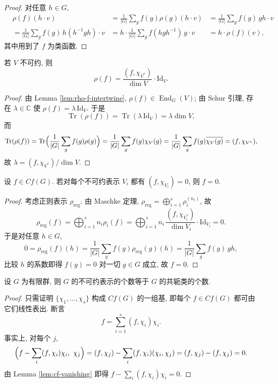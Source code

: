 \begin{proof}
对任意 $h\in G$,
\[\begin{aligned}
  &\rho(f)(h\cdot v)
  &=\frac{1}{|G|}\sum_{g}f(g)\rho(g)(h\cdot v)
  &=\frac{1}{|G|}\sum_{g}f(g)\,gh\cdot v\\
  &=\frac{1}{|G|}\sum_{g}f(g)\,h(h^{-1}gh)\cdot v
  &=h\cdot\frac{1}{|G|}\sum_{g}f(hgh^{-1})\,g\cdot v
  &=h\cdot\rho(f)(v),
\end{aligned}\]
其中用到了 $f$ 为类函数.
\end{proof}

\begin{corollary}\label{cor:rho-f-scalar}
若 $V$ 不可约, 则
\[
  \rho(f)=\frac{(f,\chi_{V^*})}{\dim V}\cdot\mathrm{Id}_V .
\]
\end{corollary}

\begin{proof}
由 Lemma \ref{lem:rho-f-intertwine}, $\rho(f)\in\operatorname{End}_G(V)$; 由 Schur 引理,
存在 $\lambda\in\mathbb{C}$ 使 $\rho(f)=\lambda\,\mathrm{Id}_V$. 于是
\[
  \operatorname{Tr}(\rho(f))=\operatorname{Tr}(\lambda\,\mathrm{Id}_V)=\lambda\dim V,
\]
而
\[
  \operatorname{Tr}(\rho(f))=\operatorname{Tr}\Bigl(\frac{1}{|G|}\sum_g f(g)\rho(g)\Bigr)
  =\frac{1}{|G|}\sum_g f(g)\chi_V(g)
  =\frac{1}{|G|}\sum_g f(g)\overline{\chi_V(g)}=(f,\chi_{V^*}),
\]
故 $\lambda=(f,\chi_{V^*})/\dim V$.
\end{proof}

\begin{lemma}\label{lem:cf-vanishing}
设 $f\in Cf(G)$. 若对每个不可约表示 $V_i$ 都有 $(f,\chi_{V_i})=0$, 则 $f=0$.
\end{lemma}

\begin{proof}
考虑正则表示 $\rho_{\mathrm{reg}}$. 由 Maschke 定理,
$\rho_{\mathrm{reg}}=\bigoplus_{i=1}^{s}\rho_i^{(n_i)}$, 故
\[
  \rho_{\mathrm{reg}}(f)=\bigoplus_{i=1}^{s}n_i\rho_i(f)
  =\bigoplus_{i=1}^{s}n_i\,\frac{(f,\chi_{V_i^*})}{\dim V_i}\cdot\mathrm{Id}_{V_i}=0 .
\]
于是对任意 $h\in G$,
\[
  0=\rho_{\mathrm{reg}}(f)(h)=\frac{1}{|G|}\sum_{g}f(g)\rho_{\mathrm{reg}}(g)(h)
  =\frac{1}{|G|}\sum_{g}f(g)\,gh,
\]
比较 $h$ 的系数即得 $f(g)=0$ 对一切 $g\in G$ 成立, 故 $f=0$.
\end{proof}

\begin{theorem}\label{thm:num-irreducible}
设 $G$ 为有限群, 则 $G$ 的不可约表示的个数等于 $G$ 的共轭类的个数.
\end{theorem}

\begin{proof}
只需证明 $\{\chi_1,\dots,\chi_s\}$ 构成 $Cf(G)$ 的一组基, 即每个 $f\in Cf(G)$
都可由它们线性表出. 断言
\[
  f=\sum_{i=1}^{s}(f,\chi_i)\chi_i .
\]
事实上, 对每个 $j$,
\[
  \Bigl(f-\sum_i (f,\chi_i)\chi_i,\ \chi_j\Bigr)
  =(f,\chi_j)-\sum_i(f,\chi_i)(\chi_i,\chi_j)=(f,\chi_j)-(f,\chi_j)=0 .
\]
由 Lemma \ref{lem:cf-vanishing} 即得 $f-\sum_i(f,\chi_i)\chi_i=0$.
\end{proof}

